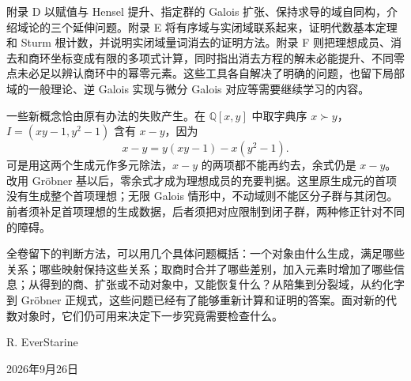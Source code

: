 \ProseParagraphBreak
附录 D 以赋值与 Hensel 提升、指定群的 Galois 扩张、保持求导的域自同构，介绍域论的三个延伸问题。附录 E 将有序域与实闭域联系起来，证明代数基本定理和 Sturm 根计数，并说明实闭域量词消去的证明方法。附录 F 则把理想成员、消去和商环坐标变成有限的多项式计算，同时指出消去方程的解未必能提升、不同零点未必足以辨认商环中的幂零元素。这些工具各自解决了明确的问题，也留下局部域的一般理论、逆 Galois 实现与微分 Galois 对应等需要继续学习的内容。

\ProseParagraphBreak
一些新概念恰由原有办法的失败产生。在 \(\mathbb Q[x,y]\) 中取字典序 \(x\succ y\)，\(I=(xy-1,y^2-1)\) 含有 \(x-y\)，因为
\[
	x-y=y(xy-1)-x(y^2-1).
\]
可是用这两个生成元作多元除法，\(x-y\) 的两项都不能再约去，余式仍是 \(x-y\)。改用 Gröbner 基以后，零余式才成为理想成员的充要判据。这里原生成元的首项没有生成整个首项理想；无限 Galois 情形中，不动域则不能区分子群与其闭包。前者须补足首项理想的生成数据，后者须把对应限制到闭子群，两种修正针对不同的障碍。

\ProseParagraphBreak
全卷留下的判断方法，可以用几个具体问题概括：一个对象由什么生成，满足哪些关系；哪些映射保持这些关系；取商时合并了哪些差别，加入元素时增加了哪些信息；从得到的商、扩张或不动对象中，又能恢复什么？从陪集到分裂域，从约化字到 Gröbner 正规式，这些问题已经有了能够重新计算和证明的答案。面对新的代数对象时，它们仍可用来决定下一步究竟需要检查什么。

\bigskip
\begin{flushright}
	R. EverStarine

	2026年9月26日
\end{flushright}
